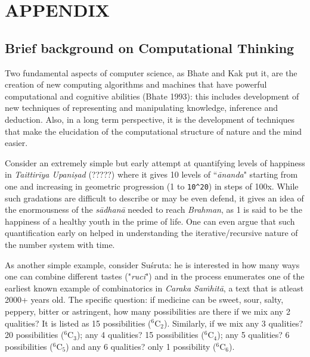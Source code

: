 {\appendix
\section{APPENDIX}\label{chap3-app1}


\subsection*{Brief background on Computational Thinking}

Two fundamental aspects of computer science, as Bhate and Kak put it, are the creation of new computing algorithms and machines that have powerful computational and cognitive abilities (Bhate 1993): this includes development of new techniques of representing and manipulating knowledge, inference and deduction. Also, in a long term perspective, it is the development of techniques that make the elucidation of the computational structure of nature and the mind easier.

Consider an extremely simple but early attempt at quantifying levels of happiness in \textsl{Taittirīya Upaniṣad} (?????) where it gives 10 levels of “\textsl{ānanda}" starting from one and increasing in geometric progression (1 to \verb|10^20|) in steps of 100x. While such gradations are difficult to describe or may be even defend, it gives an idea of the enormousness of the \textsl{sādhanā} needed to reach \textsl{Brahman}, as 1 is said to be the happiness of a healthy youth in the prime of life. One can even argue that such quantification early on helped in understanding the iterative/recursive nature of the number system with time.

As another simple example, consider Suśruta: he is interested in how many ways one can combine different tastes ("\textsl{ruci}") and in the process enumerates one of the earliest known example of combinatorics in \textsl{Caraka Saṁhitā}, a text that is atleast 2000+ years old. The specific question: if medicine can be sweet, sour, salty, peppery, bitter or astringent, how many possibilities are there if we mix any 2 qualities? It is listed as 15 possibilities ($^{6}$C$_{2}$). Similarly, if we mix any 3 qualities? 20 possibilities ($^{6}$C$_{3}$); any 4 qualities? 15 possibilities ($^{6}$C$_{4}$); any 5 qualities? 6 possibilities ($^{6}$C$_{5}$) and any 6 qualities? only 1 possibility ($^{6}$C$_{6}$).

}
